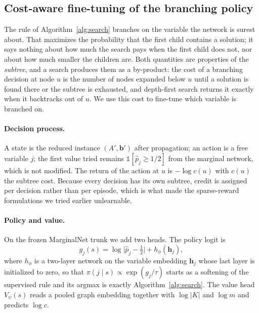\documentclass[final,5p,times,twocolumn]{elsarticle}
\begin{document}
\subsection{Cost-aware fine-tuning of the branching policy}
\label{sec:method-rl}

The rule of Algorithm~\ref{alg:search} branches on the variable the network is surest about. That maximizes the probability that the first child contains a solution; it says nothing about how much the search pays when the first child does not, nor about how much smaller the children are. Both quantities are properties of the \emph{subtree}, and a search produces them as a by-product: the cost of a branching decision at node $u$ is the number of nodes expanded below $u$ until a solution is found there or the subtree is exhausted, and depth-first search returns it exactly when it backtracks out of $u$. We use this cost to fine-tune which variable is branched on.

\paragraph{Decision process.} A state is the reduced instance $(A',\mathbf{b}')$ after propagation; an action is a free variable $j$; the first value tried remains $\mathbb{1}[\hat p_j\ge1/2]$ from the marginal network, which is not modified. The return of the action at $u$ is $-\log c(u)$ with $c(u)$ the subtree cost. Because every decision has its own subtree, credit is assigned per decision rather than per episode, which is what made the sparse-reward formulations we tried earlier unlearnable.

\paragraph{Policy and value.} On the frozen MarginalNet trunk we add two heads. The policy logit is
\begin{equation}
g_j(s) = \log\bigl|\hat p_j - \tfrac12\bigr| + h_\phi(\mathbf{h}_j),
\end{equation}
where $h_\phi$ is a two-layer network on the variable embedding $\mathbf{h}_j$ whose last layer is initialized to zero, so that $\pi(j\mid s)\propto\exp(g_j/\tau)$ starts as a softening of the supervised rule and its argmax is exactly Algorithm~\ref{alg:search}. The value head $V_\psi(s)$ reads a pooled graph embedding together with $\log|K|$ and $\log m$ and predicts $\log c$.
\end{document}
